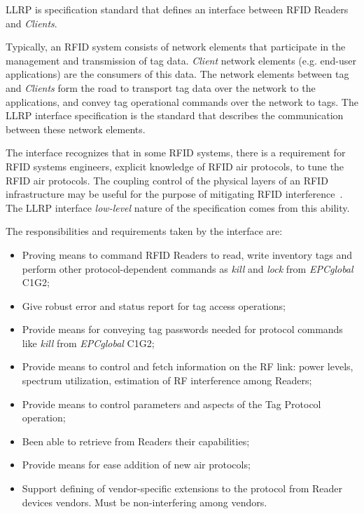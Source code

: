 
\gls{LLRP} is specification standard that defines an interface between \gls{RFID} Readers and \emph{Clients}.

Typically, an RFID system consists of network elements that participate in the management and transmission of tag data.
\emph{Client} network elements (e.g. end-user applications) are the consumers of this data.
The network elements between tag and \emph{Clients} form the road to transport tag data over the network to the applications, and convey tag operational commands over the network to tags.
The \gls{LLRP} interface specification is the standard that describes the communication between these network elements.


The interface recognizes that in some RFID systems, there is a requirement for RFID systems engineers, explicit knowledge of RFID air protocols, to tune the RFID air protocols. 
The coupling control of the physical layers of an RFID infrastructure may be useful for the purpose of mitigating RFID interference~\cite{Llrp1standard20101013Pdf}.
The \gls{LLRP} interface \emph{low-level} nature of the specification comes from this ability.

The responsibilities and requirements taken by the interface are:

\begin{itemize}
    \setlength{\parskip}{0pt}
    \setlength{\itemsep}{0pt}
    \item Proving means to command \gls{RFID} Readers to read, write inventory tags and perform other protocol-dependent commands as \emph{kill} and \emph{lock} from \emph{EPCglobal} \gls{C1G2};
    \item Give robust error and status report for tag access operations;
    \item Provide means for conveying tag passwords needed for protocol commands like \emph{kill} from \emph{EPCglobal} \gls{C1G2};
    \item Provide means to control and fetch information on the \gls{RF} link: power levels, spectrum utilization, estimation of \gls{RF} interference among Readers;
    \item Provide means to control parameters and aspects of the Tag Protocol operation;
    \item Been able to retrieve from Readers their capabilities;
    \item Provide means for ease addition of new air protocols;
    \item Support defining of vendor-specific extensions to the protocol from Reader devices vendors. Must be non-interfering  among vendors.
\end{itemize}

